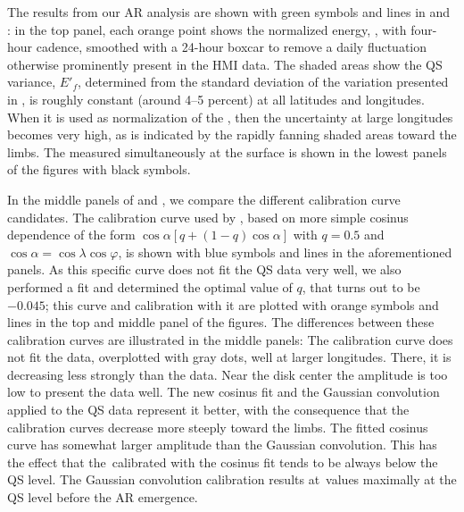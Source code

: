 \documentclass{aa}
\begin{document}
The results from our AR analysis are shown with green symbols and lines in  and : in the top panel, each orange point shows the normalized \fff energy, \eft, with four-hour cadence, 
smoothed with a 24-hour boxcar to remove a daily fluctuation
otherwise prominently present in the HMI data. The shaded areas show the QS variance, $E'_f$,
determined from the standard deviation of the variation presented in ,
is roughly constant (around 4--5 percent) at all latitudes and longitudes. When it is used as normalization of the \fffns, then the uncertainty at large longitudes becomes very high, as is indicated by the rapidly 
fanning 
shaded areas toward the limbs. The \brms{} measured simultaneously at the surface is shown in the lowest panels of the figures with black symbols. 

In the middle panels of  and , we compare the different calibration curve candidates.
The calibration curve used by 
\cite{SRB16},
based on more simple cosinus dependence of the form $\cos{\alpha} \left[q + \left(1-q \right) \cos{\alpha} \right]$ with $q=0.5$
and $\cos\alpha = \cos\lambda \cos\varphi$, is shown with blue symbols and lines in the aforementioned panels.
As this specific curve does not fit the QS data very well, we also performed a fit and determined the optimal value of $q$, that turns out to be $-0.045$; this curve and calibration with it are plotted with orange symbols and lines in the top and middle panel of the figures.
The differences between these calibration curves are illustrated in the middle panels: The \cite{SRB16} calibration
curve does not fit the data, overplotted with gray dots, well at larger longitudes. There, it 
is decreasing less strongly than the data. Near the disk center the amplitude is too low to present the data well.
The new cosinus fit and the Gaussian convolution applied to the QS
data represent it better, with the consequence that the calibration curves decrease more steeply toward the limbs.
The fitted cosinus curve has somewhat larger amplitude than the Gaussian convolution. This has the effect that the \eft\,calibrated
with the cosinus fit tends to be always below the QS level. The Gaussian convolution calibration results at \eft\,values maximally at the QS level before the AR emergence.
\end{document}

